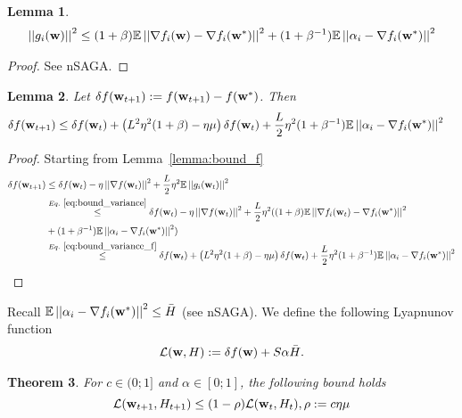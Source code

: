 \documentclass[12pt]{article}
\newcommand{\sqnorm}[1]{\left|\left|#1\right|\right|^2}
\newcommand{\w}{{\bf w}}
\newcommand{\wstar}{{\bf w^*}}
\newcommand{\E}{\mathbb{E}}
\renewcommand{\L}{{\mathcal L}}
\newcommand{\Hbar}{\bar{H}}
\newtheorem{theorem}{Theorem}
\newtheorem{lemma}[theorem]{Lemma}
\begin{document}
\begin{lemma}
\begin{align}
\sqnorm{g_i(\w)} \leq (1+\beta) \E \sqnorm{\nabla f_i(\w) - \nabla f_i(\wstar)} + (1+\beta^{-1}) \E \sqnorm{\alpha_i - \nabla f_i(\wstar)}
\label{eq:bound_variance}
\end{align}
\end{lemma}
\begin{proof}
See nSAGA.
\end{proof}

\begin{lemma}
Let $\delta f(\w_{t+1}) := f(\w_{t+1}) - f(\wstar)$. Then
\begin{align}
\delta f(\w_{t+1})
&\leq \delta f(\w_{t}) + \left( L^2 \eta^2 (1+\beta) - \eta \mu \right) \delta f(\w_{t})
+ \frac{L}{2} \eta^2 (1+\beta^{-1}) \E \sqnorm{\alpha_i - \nabla f_i(\wstar)}
\label{eq:bound_f}
\end{align}
\end{lemma}
\begin{proof}
Starting from Lemma~\ref{lemma:bound_f}
\begin{align}
\delta f(\w_{t+1})
&\leq \delta f(\w_{t}) - \eta \sqnorm{\nabla f(\w_t)} + \frac{L}{2} \eta^2 \E \sqnorm{g_i(\w_t)} \nonumber \\
&\stackrel{Eq.~\ref{eq:bound_variance}}\leq \delta f(\w_{t}) - \eta \sqnorm{\nabla f(\w_t)} + \frac{L}{2} \eta^2 ((1+\beta) \E \sqnorm{\nabla f_i(\w_t) - \nabla f_i(\wstar)} \nonumber \\
&+ (1+\beta^{-1}) \E \sqnorm{\alpha_i - \nabla f_i(\wstar)}) \nonumber \\
&\stackrel{Eq.~\ref{eq:bound_variance_f}}\leq \delta f(\w_{t}) + \left( L^2 \eta^2 (1+\beta) - \eta \mu \right) \delta f(\w_{t})
+ \frac{L}{2} \eta^2 (1+\beta^{-1}) \E \sqnorm{\alpha_i - \nabla f_i(\wstar)}
\end{align}

\end{proof}

Recall $\E \sqnorm{\alpha_i - \nabla f_i(\wstar)} \leq \Hbar$ (see nSAGA). We define the following Lyapnunov function
\begin{align}
\L(\w, H) := \delta f(\w) + S\alpha \Hbar.
\end{align}

\begin{theorem}
For $c \in (0; 1]$ and $\alpha \in [0;1]$, the following bound holds
\begin{equation}
\L(\w_{t+1}, H_{t+1}) \leq (1-\rho) \L(\w_t, H_t), \rho := c \eta \mu
\end{equation}

\end{theorem}
\end{document}
